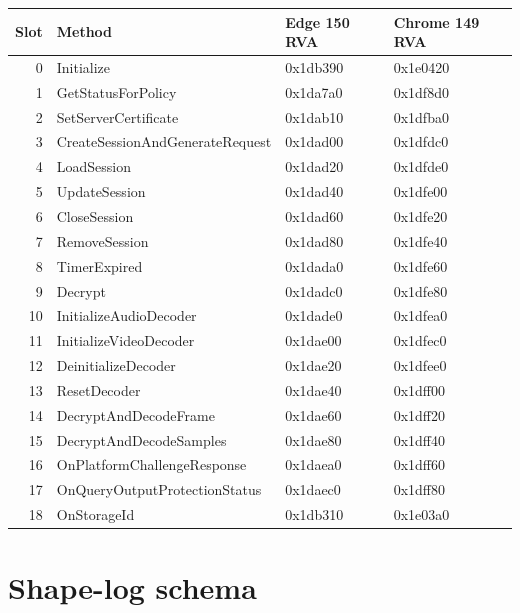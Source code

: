 \documentclass[11pt,letterpaper]{article}
\begin{document}
\begin{center}\footnotesize
\begin{tabular}{rlll}
\toprule
\textbf{Slot} & \textbf{Method} & \textbf{Edge 150 RVA} & \textbf{Chrome 149 RVA} \\
\midrule
0  & Initialize                       & 0x1db390 & 0x1e0420 \\
1  & GetStatusForPolicy                & 0x1da7a0 & 0x1df8d0 \\
2  & SetServerCertificate              & 0x1dab10 & 0x1dfba0 \\
3  & CreateSessionAndGenerateRequest   & 0x1dad00 & 0x1dfdc0 \\
4  & LoadSession                       & 0x1dad20 & 0x1dfde0 \\
5  & UpdateSession                     & 0x1dad40 & 0x1dfe00 \\
6  & CloseSession                      & 0x1dad60 & 0x1dfe20 \\
7  & RemoveSession                     & 0x1dad80 & 0x1dfe40 \\
8  & TimerExpired                      & 0x1dada0 & 0x1dfe60 \\
9  & Decrypt                           & 0x1dadc0 & 0x1dfe80 \\
10 & InitializeAudioDecoder            & 0x1dade0 & 0x1dfea0 \\
11 & InitializeVideoDecoder            & 0x1dae00 & 0x1dfec0 \\
12 & DeinitializeDecoder               & 0x1dae20 & 0x1dfee0 \\
13 & ResetDecoder                      & 0x1dae40 & 0x1dff00 \\
14 & DecryptAndDecodeFrame             & 0x1dae60 & 0x1dff20 \\
15 & DecryptAndDecodeSamples           & 0x1dae80 & 0x1dff40 \\
16 & OnPlatformChallengeResponse       & 0x1daea0 & 0x1dff60 \\
17 & OnQueryOutputProtectionStatus     & 0x1daec0 & 0x1dff80 \\
18 & OnStorageId                       & 0x1db310 & 0x1e03a0 \\
\bottomrule
\end{tabular}
\end{center}

\section{Shape-log schema}
\label{app:schema}
\end{document}
